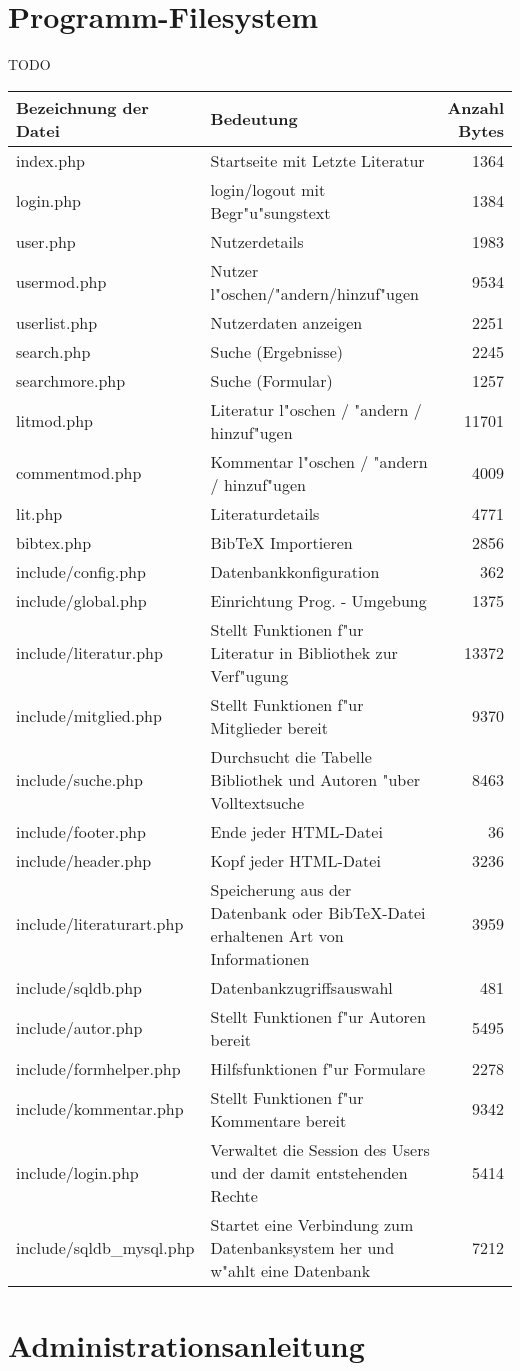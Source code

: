 \section{Programm-Filesystem}
{TODO}
\begin{longtable}{|l|p{6cm}|r|}
\hline
{\bf Bezeichnung der Datei} & {\bf Bedeutung} & {\bf Anzahl Bytes}\\
\hline
\endhead

index.php & Startseite mit Letzte Literatur & 1364\\
\hline
login.php & login/logout mit Begr"u"sungstext & 1384\\
\hline
user.php & Nutzerdetails & 1983\\
\hline
usermod.php & Nutzer l"oschen/"andern/hinzuf"ugen & 9534\\
\hline
userlist.php & Nutzerdaten anzeigen & 2251\\
\hline
search.php & Suche (Ergebnisse) & 2245\\
\hline
searchmore.php & Suche (Formular) & 1257\\
\hline
litmod.php & Literatur l"oschen / "andern / hinzuf"ugen & 11701\\
\hline
commentmod.php & Kommentar l"oschen / "andern / hinzuf"ugen & 4009\\
\hline
lit.php & Literaturdetails & 4771\\
\hline
bibtex.php & BibTeX Importieren & 2856\\
\hline
include/config.php & Datenbankkonfiguration & 362\\
\hline
include/global.php & Einrichtung Prog. - Umgebung & 1375\\
\hline
include/literatur.php & Stellt Funktionen f"ur Literatur in Bibliothek zur Verf"ugung & 13372\\
\hline
include/mitglied.php & Stellt Funktionen f"ur Mitglieder bereit & 9370\\
\hline
include/suche.php & Durchsucht die Tabelle Bibliothek und Autoren "uber Volltextsuche & 8463\\
\hline
include/footer.php & Ende jeder HTML-Datei & 36 \\
\hline
include/header.php & Kopf jeder HTML-Datei & 3236 \\
\hline
include/literaturart.php & Speicherung aus der Datenbank oder BibTeX-Datei erhaltenen Art von Informationen & 3959\\
\hline
include/sqldb.php & Datenbankzugriffsauswahl & 481 \\
\hline
include/autor.php & Stellt Funktionen f"ur Autoren bereit & 5495\\
\hline
include/formhelper.php & Hilfsfunktionen f"ur Formulare & 2278\\
\hline
include/kommentar.php & Stellt Funktionen f"ur Kommentare bereit & 9342\\
\hline   
include/login.php &  Verwaltet die Session des Users und der damit entstehenden Rechte & 5414\\
\hline
include/sqldb\_mysql.php & Startet eine Verbindung zum Datenbanksystem her und w"ahlt eine Datenbank & 7212\\
\hline
\end{longtable}


\section{Administrationsanleitung}
